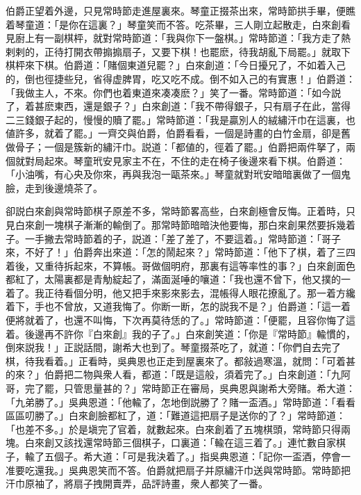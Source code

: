 伯爵正望着外邊，只見常時節走進屋裏來。琴童正掇茶出來，常時節拱手畢，便瞧着琴童道：「是你在這裏？」琴童笑而不答。吃茶畢，三人剛立起散走，白來創看見廚上有一副棋枰，就對常時節道：「我與你下一盤棋。」常時節道：「我方走了熱剌剌的，正待打開衣帶搧搧扇子，又要下棋！也罷麽，待我胡亂下局罷。」就取下棋枰來下棋。伯爵道：「賭個東道兒罷？」白來創道：「今日擾兄了，不如着入己的，倒也徑捷些兒，省得虚脾胃，吃又吃不成。倒不如入己的有實惠！」伯爵道：「我做主人，不來。你們也着東道來凑凑麽？」笑了一番。常時節道：「如今説了，着甚麽東西，還是銀子？」白來創道：「我不帶得銀子，只有扇子在此，當得二三錢銀子起的，慢慢的贖了罷。」常時節道：「我是贏別人的絨繡汗巾在這裏，也値許多，就着了罷。」一齊交與伯爵，伯爵看看，一個是詩畫的白竹金扇，卻是舊做骨子；一個是簇新的繡汗巾。説道：「都値的，徑着了罷。」伯爵把兩件拏了，兩個就對局起來。琴童玳安見家主不在，不住的走在椅子後邊來看下棋。伯爵道：「小油嘴，有心央及你來，再與我泡一甌茶來。」琴童就對玳安暗暗裏做了一個鬼臉，走到後邊燒茶了。

卻説白來創與常時節棋子原差不多，常時節畧高些，白來創極會反悔。正着時，只見白來創一塊棋子漸漸的輸倒了。那常時節暗暗決他要悔，那白來創果然要拆幾着子。一手撇去常時節着的子，説道：「差了差了，不要這着。」常時節道：「哥子來，不好了！」伯爵奔出來道：「怎的鬧起來？」常時節道：「他下了棋，着了三四着後，又重待拆起來，不算帳。哥做個明府，那裏有這等率性的事？」白來創面色都紅了，太陽裏都是青觔綻起了，滿面涎唾的嚷道：「我也還不曾下，他又撲的一着了。我正待看個分明，他又把手來影來影去，混帳得人眼花撩亂了。那一着方纔着下，手也不曾放，又道我悔了。你断一断，怎的説我不是？」伯爵道：「這一着便將就着了，也還不叫悔，下次再莫待恁的了。」常時節道：「便罷，且容你悔了這着。後邊再不許你『白來創』我的子了。」白來創笑道：「你是『常時節』輸慣的，倒來説我！」正説話間，謝希大也到了。琴童掇茶吃了，就道：「你們自去完了棋，待我看着。」正看時，吳典恩也正走到屋裏來了。都敍過寒溫，就問：「可着甚的來？」伯爵把二物與衆人看，都道：「既是這般，須着完了。」白來創道：「九阿哥，完了罷，只管思量甚的？」常時節正在審局，吳典恩與謝希大旁賭。希大道：「九弟勝了。」吳典恩道：「他輸了，怎地倒説勝了？賭一盃酒。」常時節道：「看看區區叨勝了。」白來創臉都紅了，道：「難道這把扇子是送你的了？」常時節道：「也差不多。」於是塡完了官着，就數起來。白來創着了五塊棋頭，常時節只得兩塊。白來創又該找還常時節三個棋子，口裏道：「輸在這三着了。」連忙數自家棋子，輸了五個子。希大道：「可是我決着了。」指吳典恩道：「記你一盃酒，停會一准要吃還我。」吳典恩笑而不答。伯爵就把扇子并原繡汗巾送與常時節。常時節把汗巾原袖了，將扇子拽開賣弄，品評詩畫，衆人都笑了一番。

